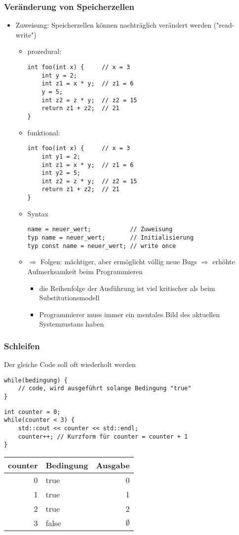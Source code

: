 \documentclass[a4paper]{scrartcl}
\begin{document}
\subsubsection{Veränderung von Speicherzellen}
\label{sec-8-2-3}
\begin{itemize}
\item Zuweisung: Speicherzellen können nachträglich verändert werden ("read-write")
\begin{itemize}
\item prozedural:
\begin{verbatim}
int foo(int x) {     // x = 3
	int y = 2;
	int z1 = x * y;  // z1 = 6
	y = 5;
	int z2 = z * y;  // z2 = 15
	return z1 + z2;  // 21
}
\end{verbatim}
\item funktional:
\begin{verbatim}
int foo(int x) {     // x = 3
	int y1 = 2;
	int z1 = x * y;  // z1 = 6
	int y2 = 5;
	int z2 = z * y;  // z2 = 15
	return z1 + z2;  // 21
}
\end{verbatim}
\item Syntax
\begin{verbatim}
name = neuer_wert;           // Zuweisung
typ name = neuer_wert;       // Initialisierung
typ const name = neuer_wert; // write once
\end{verbatim}
\item $\Rightarrow$ Folgen: mächtiger, aber ermöglicht völlig neue Bugs $\Rightarrow$ erhöhte Aufmerksamkeit beim Programmieren
\begin{itemize}
\item die Reihenfolge der Ausführung ist viel kritischer als beim Substitutionsmodell
\item Programmierer muss immer ein mentales Bild des aktuellen Systemzustans haben
\end{itemize}
\end{itemize}
\end{itemize}
\subsubsection{Schleifen}
\label{sec-8-2-4}
Der gleiche Code soll oft wiederholt werden
\begin{verbatim}
while(bedingung) {
	// code, wird ausgeführt solange Bedingung "true"
}
\end{verbatim}
\begin{verbatim}
int counter = 0;
while(counter < 3) {
	std::cout << counter << std::endl;
	counter++; // Kurzform für counter = counter + 1
}
\end{verbatim}
\begin{center}
\begin{tabular}{rlr}
counter & Bedingung & Ausgabe\\
\hline
0 & true & 0\\
1 & true & 1\\
2 & true & 2\\
3 & false & $\emptyset$\\
\end{tabular}
\end{center}
\end{document}
